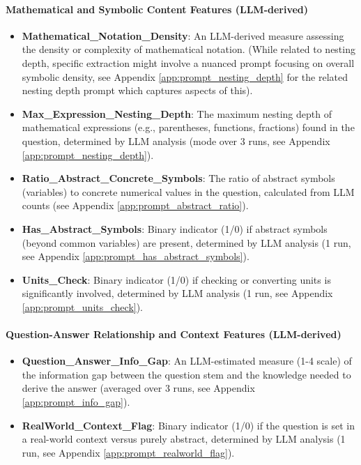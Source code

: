 \documentclass[
    a4paper, %
    10pt, %
    twoside, %
]{LTJournalArticle}
\begin{document}
\paragraph{Mathematical and Symbolic Content Features (LLM-derived)}
\begin{itemize}
    \item \textbf{Mathematical\_Notation\_Density}: An LLM-derived measure assessing the density or complexity of mathematical notation. (While related to nesting depth, specific extraction might involve a nuanced prompt focusing on overall symbolic density, see Appendix \ref{app:prompt_nesting_depth} for the related nesting depth prompt which captures aspects of this).
    \item \textbf{Max\_Expression\_Nesting\_Depth}: The maximum nesting depth of mathematical expressions (e.g., parentheses, functions, fractions) found in the question, determined by LLM analysis (mode over 3 runs, see Appendix \ref{app:prompt_nesting_depth}).
    \item \textbf{Ratio\_Abstract\_Concrete\_Symbols}: The ratio of abstract symbols (variables) to concrete numerical values in the question, calculated from LLM counts (see Appendix \ref{app:prompt_abstract_ratio}).
    \item \textbf{Has\_Abstract\_Symbols}: Binary indicator (1/0) if abstract symbols (beyond common variables) are present, determined by LLM analysis (1 run, see Appendix \ref{app:prompt_has_abstract_symbols}).
    \item \textbf{Units\_Check}: Binary indicator (1/0) if checking or converting units is significantly involved, determined by LLM analysis (1 run, see Appendix \ref{app:prompt_units_check}).
\end{itemize}

\paragraph{Question-Answer Relationship and Context Features (LLM-derived)}
\begin{itemize}
    \item \textbf{Question\_Answer\_Info\_Gap}: An LLM-estimated measure (1-4 scale) of the information gap between the question stem and the knowledge needed to derive the answer (averaged over 3 runs, see Appendix \ref{app:prompt_info_gap}).
    \item \textbf{RealWorld\_Context\_Flag}: Binary indicator (1/0) if the question is set in a real-world context versus purely abstract, determined by LLM analysis (1 run, see Appendix \ref{app:prompt_realworld_flag}).
\end{itemize}
\end{document}
